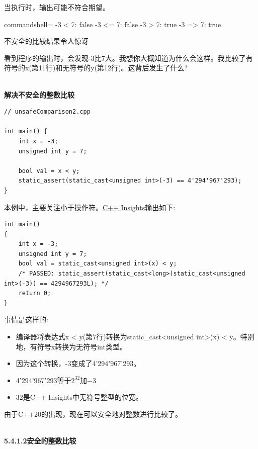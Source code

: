 当执行时，输出可能不符合期望。

\begin{tcblisting}{commandshell={}}
-3 < 7: false
-3 <= 7: false
-3 > 7: true
-3 => 7: true
\end{tcblisting}

\begin{center}
不安全的比较结果令人惊讶
\end{center}

看到程序的输出时，会发现-3比7大。我想你大概知道为什么会这样。我比较了有符号的x(第11行)和无符号的y(第12行)。这背后发生了什么?

\hspace*{\fill} \\ %
\noindent
\textbf{解决不安全的整数比较}
\begin{lstlisting}[style=styleCXX]
// unsafeComparison2.cpp

int main() {
	int x = -3;
	unsigned int y = 7;
	
	bool val = x < y;
	static_assert(static_cast<unsigned int>(-3) == 4'294'967'293);
}
\end{lstlisting}

本例中，主要关注小于操作符。\href{https://cppinsights.io/s/62732a01}{C++ Insights}输出如下:

\begin{lstlisting}[style=styleCXX]
int main()
{
	int x = -3;
	unsigned int y = 7;
	bool val = static_cast<unsigned int>(x) < y;
	/* PASSED: static_assert(static_cast<long>(static_cast<unsigned int>(-3)) == 4294967293L); */
	return 0;
}
\end{lstlisting}

事情是这样的:

\begin{itemize}
\item 
编译器将表达式x < y(第7行)转换为static\_cast<unsigned int>(x) < y。特别地，有符号x转换为无符号int类型。

\item 
因为这个转换，-3变成了4'294'967'293。

\item 
4'294'967'293等于$ 2^{32} $加−3

\item 
32是C++ Insights中无符号整型的位宽。
\end{itemize}

由于C++20的出现，现在可以安全地对整数进行比较了。

\hspace*{\fill} \\ %
\noindent
\textbf{5.4.1.2\hspace{0.2cm}安全的整数比较}

